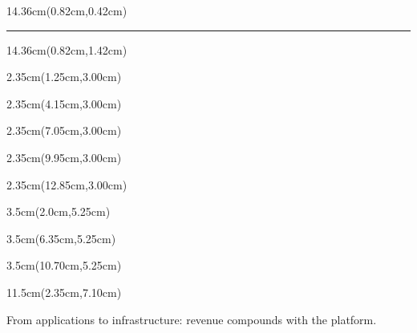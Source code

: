 \begin{frame}[plain]
\begin{textblock*}{14.36cm}(0.82cm,0.42cm)
  \par
  \vspace{0.08cm}
  {\color{SBPrimary}\rule{2.25cm}{1.3pt}}
\end{textblock*}

\begin{textblock*}{14.36cm}(0.82cm,1.42cm)
\end{textblock*}

\begin{textblock*}{2.35cm}(1.25cm,3.00cm)
\end{textblock*}
\begin{textblock*}{2.35cm}(4.15cm,3.00cm)
\end{textblock*}
\begin{textblock*}{2.35cm}(7.05cm,3.00cm)
\end{textblock*}
\begin{textblock*}{2.35cm}(9.95cm,3.00cm)
\end{textblock*}
\begin{textblock*}{2.35cm}(12.85cm,3.00cm)
\end{textblock*}

\begin{textblock*}{3.5cm}(2.0cm,5.25cm)
\end{textblock*}
\begin{textblock*}{3.5cm}(6.35cm,5.25cm)
\end{textblock*}
\begin{textblock*}{3.5cm}(10.70cm,5.25cm)
\end{textblock*}

\begin{textblock*}{11.5cm}(2.35cm,7.10cm)
\begin{center}
{\SBFontBody\fontsize{9.2}{11.2}\selectfont\color{SBGray}From applications to infrastructure: revenue compounds with the platform.}
\end{center}
\end{textblock*}
\SBFixedFooter
\end{frame}
